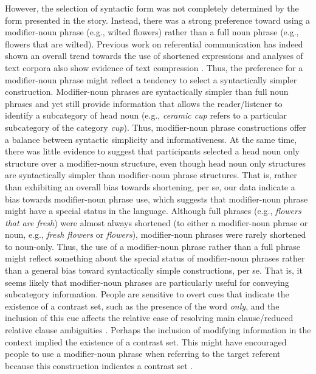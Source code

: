 \documentclass[output=paper]{langsci/langscibook}
\begin{document}
However, the selection of syntactic form was not completely determined
by the form presented in the story. Instead, there was a strong
preference toward using a modifier-noun phrase (e.g., wilted flowers)
rather than a full noun phrase (e.g., flowers that are wilted).
Previous work on referential communication has indeed shown an overall
trend towards the use of shortened expressions
\citep{brennan1996conceptual,markman1997creation} and analyses of text
corpora also show evidence of text compression
\citep{marsh1984computational}. Thus, the preference for a
modifier-noun phrase might reflect a tendency to select a
syntactically simpler construction. Modifier-noun phrases are
syntactically simpler than full noun phrases and yet still provide
information that allows the reader/listener to identify a subcategory
of head noun (e.g., \textit{ceramic cup} refers to a particular
subcategory of the category \textit{cup}). Thus, modifier-noun phrase
constructions offer a balance between syntactic simplicity and
informativeness. At the same time, there was little evidence to
suggest that participants selected a head noun only structure over a
modifier-noun structure, even though head noun only structures are
syntactically simpler than modifier-noun phrase structures. That is,
rather than exhibiting an overall bias towards shortening, per se, our
data indicate a bias towards modifier-noun phrase use, which suggests
that modifier-noun phrase might have a special status in the
language. Although full phrases (e.g., \textit{flowers that are
  fresh}) were almost always shortened (to either a modifier-noun
phrase or noun, e.g., \textit{fresh flowers} or \textit{flowers}),
modifier-noun phrases were rarely shortened to noun-only.  Thus, the
use of a modifier-noun phrase rather than a full phrase might reflect
something about the special status of modifier-noun phrases rather
than a general bias toward syntactically simple constructions, per
se. That is, it seems likely that modifier-noun phrases are
particularly useful for conveying subcategory information. People are
sensitive to overt cues that indicate the existence of a contrast set,
such as the presence of the word \textit{only}, and the inclusion of
this cue affects the relative ease of resolving main clause/reduced
relative clause ambiguities \citep{sedivy2002invoking}. Perhaps the
inclusion of modifying information in the context implied the
existence of a contrast set. This might have encouraged people to use
a modifier-noun phrase when referring to the target referent because
this construction indicates a contrast set
\citep{markman1991categorization}.
\end{document}

